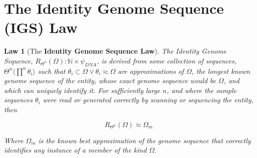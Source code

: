 \documentclass[a4paper, 18pt]{article} %
\newtheorem{law}{Law}
\begin{document}
\section{The Identity Genome Sequence (IGS) Law}
\label{SECIGSL}

\begin{law}[The \textbf{Identity Genome Sequence Law}]
\label{LAWGDL}
The Identity Genome Sequence, $R_{\Theta^n}(\Omega): \mathbb{N} \times \psi_{DNA}$, is derived from some collection of sequences, $\Theta^n \langle \prod\limits^n \theta_i \rangle$ such that $\theta_i \subset \Omega \lor \theta_i \approx \Omega$ are approximations of $\Omega$, the longest known genome sequence of the entity, whose exact genome sequence would be $\Omega$, and which can uniquely identify it. For sufficiently large $n$, and where the sample sequences $\theta_i$ were read or generated correctly by scanning or sequencing the entity, then 

\begin{equation}
\label{SEQRofOM}
R_{\Theta^n}(\Omega) \approx \Omega_m
\end{equation} 

Where $\Omega_m$ is the known best approximation of the genome sequence that correctly identifies any instance of a member of the kind $\Omega$.
\end{law}
\end{document}
